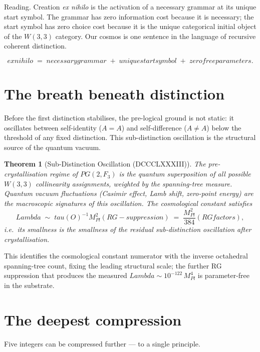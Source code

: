 \documentclass[11pt]{article}
\def\mathbb#1{#1}%
\def\mathrm#1{#1}%
\def\textbf#1{#1}%
\def\text#1{#1}%
\def\Lambda{Lambda}%
\def\tau{tau}%
\def\cdot{ }%
\newtheorem*{theorem}{Theorem}
\begin{document}
\textbf{Reading.} Creation \emph{ex nihilo} is the activation of a necessary grammar at its unique start symbol. The grammar has zero information cost because it is necessary; the start symbol has zero choice cost because it is the unique categorical initial object of the $W(3,3)$ category. \textbf{Our cosmos is one sentence in the language of recursive coherent distinction.}

\[
\boxed{\;\text{ex nihilo} \;=\; \text{necessary grammar} \;+\; \text{unique start symbol} \;+\; \text{zero free parameters.}\;}
\]

\section{The breath beneath distinction}

\label{sec:ground-breathes}

Before the first distinction stabilises, the pre-logical ground is not static: it oscillates between self-identity ($A = A$) and self-difference ($A \neq A$) below the threshold of any fixed distinction. This sub-distinction oscillation is the structural source of the quantum vacuum.

\begin{theorem}[Sub-Distinction Oscillation (DCCCLXXXIII)]
The pre-crystallisation regime of $\mathrm{PG}(2, \mathbb{F}_3)$ is the quantum superposition of all possible $W(3,3)$ collinearity assignments, weighted by the spanning-tree measure. Quantum vacuum fluctuations (Casimir effect, Lamb shift, zero-point energy) are the macroscopic signatures of this oscillation. The cosmological constant satisfies
\[
\Lambda \;\sim\; \tau(O)^{-1} \cdot M_{\text{Pl}}^2 \cdot (\text{RG-suppression}) \;=\; \frac{M_{\text{Pl}}^2}{384} \cdot (\text{RG factors}),
\]
i.e.\ its smallness is the smallness of the residual sub-distinction oscillation after crystallisation.
\end{theorem}

This identifies the cosmological constant numerator with the inverse octahedral spanning-tree count, fixing the leading structural scale; the further RG suppression that produces the measured $\Lambda \sim 10^{-122}\, M_{\text{Pl}}^4$ is parameter-free in the substrate.

\section{The deepest compression}

Five integers can be compressed further --- to a single principle.
\end{document}
